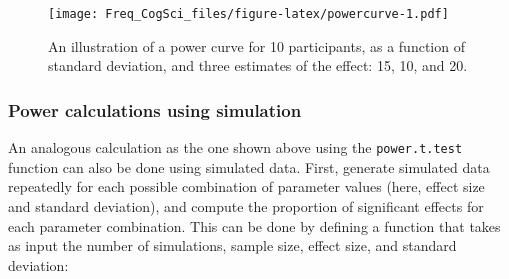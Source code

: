 \documentclass[12pt,]{krantz}
\newenvironment{Shaded}{\begin{snugshade}}{\end{snugshade}}
\newcommand{\CommentTok}[1]{\textcolor[rgb]{0.56,0.35,0.01}{\textit{#1}}}
\newcommand{\ControlFlowTok}[1]{\textcolor[rgb]{0.13,0.29,0.53}{\textbf{#1}}}
\newcommand{\DataTypeTok}[1]{\textcolor[rgb]{0.13,0.29,0.53}{#1}}
\newcommand{\DecValTok}[1]{\textcolor[rgb]{0.00,0.00,0.81}{#1}}
\newcommand{\KeywordTok}[1]{\textcolor[rgb]{0.13,0.29,0.53}{\textbf{#1}}}
\newcommand{\NormalTok}[1]{#1}
\newcommand{\OperatorTok}[1]{\textcolor[rgb]{0.81,0.36,0.00}{\textbf{#1}}}
\newcommand{\OtherTok}[1]{\textcolor[rgb]{0.56,0.35,0.01}{#1}}
\newcommand{\StringTok}[1]{\textcolor[rgb]{0.31,0.60,0.02}{#1}}
\begin{document}
\begin{figure}
\centering
\texttt{[image: Freq\_CogSci\_files/figure-latex/powercurve-1.pdf]}
\caption{\label{fig:powercurve}An illustration of a power curve for 10 participants, as a function of standard deviation, and three estimates of the effect: 15, 10, and 20.}
\end{figure}

\hypertarget{power-calculations-using-simulation}{%
\subsubsection{Power calculations using simulation}\label{power-calculations-using-simulation}}

An analogous calculation as the one shown above using the \texttt{power.t.test} function can also be done using simulated data.
First, generate simulated data repeatedly for each possible combination of parameter values (here, effect size and standard deviation), and compute the proportion of significant effects for each parameter combination. This can be done by defining a function that takes as input the number of simulations, sample size, effect size, and standard deviation:

\begin{Shaded}
\end{Shaded}
\end{document}
